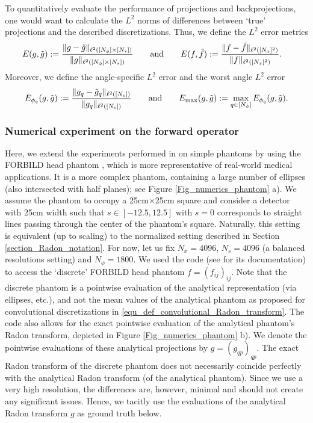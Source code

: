 \documentclass[11pt,reqno]{amsart}
\numberwithin{theorem}{section}
\theoremstyle{remark}
\begin{document}
To quantitatively evaluate the performance of projections and backprojections, one would want to calculate the $L^2$ norms of differences between `true' projections and the described discretizations.  Thus, we define the $L^2$ error metrics
\begin{align}
&E(g,\tilde g) := \frac{\| g-\tilde g\|_{\ell^2([N_\phi]\times[N_s])}}{\|g\|_{\ell^2([N_\phi]\times[N_s])}} \qquad \text{and} \qquad E(f,\tilde f) := \frac{\| f-\tilde f\|_{\ell^2([N_x]^2)}}{\|f\|_{\ell^2([N_x]^2)}}. \notag 
\end{align}
Moreover, we define the angle-specific $L^2$ error and the worst angle $L^2$ error
\begin{align}
E_{\phi_q}(g,\tilde g) := \frac{\| g_{q}-\tilde g_{q}\|_{\ell^2([N_s])}}{\|g_q\|_{\ell^2([N_s])}} \qquad \text{and} \qquad
E_\text{max}(g,\tilde g) := \max_{q \in [N_\phi]} E_{\phi_q} (g,\tilde g). \notag
\end{align}


\subsubsection{Numerical experiment on the forward operator}
Here, we extend the experiments performed in \cite{10.1007/978-3-031-92366-1_11} on simple phantoms by using the FORBILD head phantom \cite{yu2012simulation}, which is more representative of real-world medical applications. It is a more complex phantom, containing a large number of ellipses (also intersected with half planes); see Figure \ref{Fig_numerics_phantom} a). We assume the phantom to occupy a 25cm$\times$25cm square and consider a detector with 25cm width  such that $s\in[-12.5,12.5]$ with $s=0$ corresponds to straight lines passing through the center of the phantom's square.
Naturally, this setting is equivalent (up to scaling) to the normalized setting described in Section \ref{section_Radon_notation}.
For now, let us fix $N_x=4096$, $N_s=4096$ (a balanced resolutions setting) and $N_\phi=1800$.
We used the code \cite{Forbildgen} (see \cite{yu2012simulation} for its documentation) to access the `discrete' FORBILD head phantom $f=(f_{ij})_{ij}$.  Note that the discrete phantom is a pointwise evaluation of the analytical representation (via ellipses, etc.), and not the mean values of the analytical phantom as proposed for convolutional discretizations in \eqref{equ_def_convolutional_Radon_transform}. The code also allows for the exact pointwise evaluation of the analytical phantom's Radon transform, depicted in Figure \ref{Fig_numerics_phantom} b). We denote the pointwise evaluations of these analytical projections by $g=(g_{qp})_{qp}$. The exact Radon transform of the discrete phantom does not necessarily coincide perfectly with the analytical Radon transform (of the analytical phantom). Since we use a very high resolution, the differences are, however, minimal and should not create any significant issues. Hence, we tacitly use the evaluations of the analytical Radon transform $g$ as ground truth below.
\end{document}
